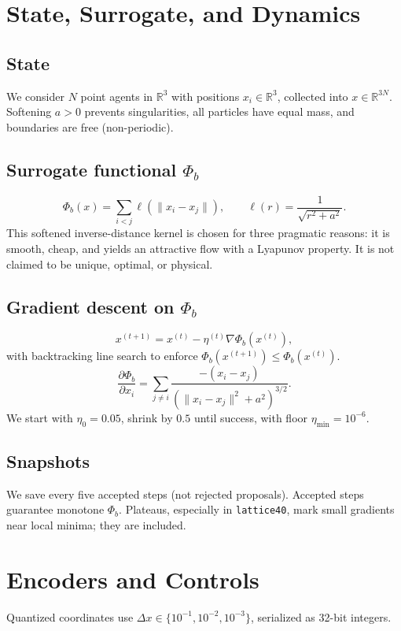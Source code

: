 \documentclass[11pt,a4paper]{article}
\numberwithin{equation}{section}
\newcommand{\R}{\mathbb{R}}
\newcommand{\phib}{\Phi_b}
\begin{document}
\section{State, Surrogate, and Dynamics}
\subsection{State}
We consider $N$ point agents in $\R^3$ with positions $x_i \in \R^3$, collected into $x \in \R^{3N}$.  
Softening $a>0$ prevents singularities, all particles have equal mass, and boundaries are free (non-periodic).

\subsection{Surrogate functional $\phib$}
\begin{equation}
\label{eq:phib-def}
\phib(x)=\sum_{i<j}\ell(\|x_i-x_j\|), \qquad \ell(r)=\frac{1}{\sqrt{r^2+a^2}}.
\end{equation}
This softened inverse-distance kernel is chosen for three pragmatic reasons: it is smooth, cheap, and yields an attractive flow with a Lyapunov property.  It is not claimed to be unique, optimal, or physical.

\subsection{Gradient descent on $\phib$}
\begin{equation}
x^{(t+1)}=x^{(t)}-\eta^{(t)}\nabla\phib(x^{(t)}),
\end{equation}
with backtracking line search to enforce $\phib(x^{(t+1)}) \le \phib(x^{(t)})$.
\begin{equation}
\frac{\partial \phib}{\partial x_i}=\sum_{j\neq i}\frac{-(x_i-x_j)}{(\|x_i-x_j\|^2+a^2)^{3/2}}.
\end{equation}
We start with $\eta_0=0.05$, shrink by $0.5$ until success, with floor $\eta_\text{min}=10^{-6}$.

\subsection{Snapshots}
We save every five accepted steps (not rejected proposals). Accepted steps guarantee monotone $\phib$. Plateaus, especially in \texttt{lattice40}, mark small gradients near local minima; they are included.

\section{Encoders and Controls}
Quantized coordinates use $\Delta x\in\{10^{-1},10^{-2},10^{-3}\}$, serialized as 32-bit integers.
\end{document}
